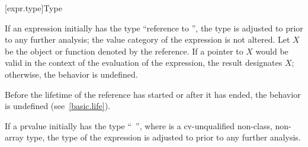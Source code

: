 [expr.type]{Type}

\pnum
{}%
If an expression initially has the type ``reference to
'', the type is adjusted to
 prior to any further analysis;
the value category of the expression is not altered.
Let $X$ be the object or function denoted by the reference.
If a pointer to $X$ would be valid in
the context of the evaluation of the expression,
the result designates $X$;
otherwise, the behavior is undefined.
\begin{note}
Before the lifetime of the reference has started or after it has ended,
the behavior is undefined (see~\ref{basic.life}).
\end{note}

\pnum
If a prvalue initially has the type ``\cv{}~'', where
 is a cv-unqualified non-class, non-array type, the type of
the expression is adjusted to  prior to any further analysis.

